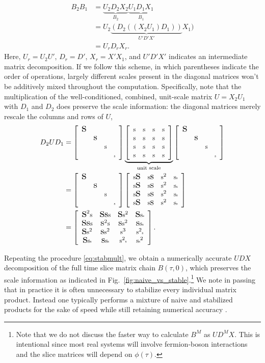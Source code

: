 \documentclass[submission, Phys]{SciPost}
\newcommand{\stiny}{\scalebox{0.5}{s}}
\newcommand{\ssmall}{\scalebox{0.9}{s}}
\newcommand{\smedium}{\scalebox{1.3}{s}}
\newcommand{\slarge}{\scalebox{1.7}{s}}
\newcommand{\U}{\left[
	\begin{array}{cccc}
		\ssmall & \ssmall & \ssmall & \ssmall \\
		\ssmall & \ssmall & \ssmall & \ssmall \\
		\ssmall & \ssmall & \ssmall & \ssmall \\
		\ssmall & \ssmall & \ssmall & \ssmall \\
	\end{array}
	\right]}
\newcommand{\D}{\left[
	\begin{array}{cccc}
		\slarge &  &  &  \\
		& \smedium &  &  \\
		&  & \ssmall &  \\
		&  &  & \stiny \\
	\end{array}
	\right]}
\begin{document}
\begin{align}
	B_2 B_1 &= \underbrace{U_2 D_2 X_2}_{B_2}\underbrace{U_1 D_1 X_1}_{B_1} \nonumber\\
	&= U_2 \underbrace{(D_2 ((X_2 U_1) D_1))}_{U' D' X'} X_1)\label{eq:stabmult}\\
	&= U_r D_r X_r. \nonumber
\end{align}
Here, $U_r = U_2 U'$, $D_r = D'$, $X_r = X' X_1$, and $U'D'X'$ indicates an intermediate matrix decomposition. If we follow this scheme, in which parentheses indicate the order of operations, largely different scales present in the diagonal matrices won't be additively mixed throughout the computation. Specifically, note that the multiplication of the well-conditioned, combined, unit-scale matrix $U = X_2 U_1$ with $D_1$ and $D_2$ does preserve the scale information: the diagonal matrices merely rescale the columns and rows of $U$,
\begin{align}
D_2  U D_1 &= \D  \underbrace{\U}_{\textrm{unit scale}} \D  \\
&= \D \left[
\begin{array}{cccc}
\ssmall\slarge & \ssmall\smedium & \ssmall^2 & \ssmall\stiny \\
\ssmall\slarge & \ssmall\smedium & \ssmall^2 & \ssmall\stiny \\
\ssmall\slarge & \ssmall\smedium & \ssmall^2 & \ssmall\stiny \\
\ssmall\slarge & \ssmall\smedium & \ssmall^2 & \ssmall\stiny \\
\end{array}
\right]\\
&= \left[
\begin{array}{cccc}
	\slarge^2\ssmall & \slarge\smedium\ssmall & \slarge\ssmall^2 & \slarge\ssmall\stiny \\
	\slarge\smedium\ssmall & \smedium^2\ssmall & \smedium\ssmall^2 & \smedium\ssmall\stiny \\
	\slarge\ssmall^2 & \smedium\ssmall^2 & \ssmall^3 & \ssmall^2\stiny \\
	\slarge\ssmall\stiny & \smedium\ssmall\stiny & \ssmall^2\stiny & \ssmall\stiny^2 \\
\end{array}
\right].
\end{align}

Repeating the procedure \eqref{eq:stabmult}, we obtain a numerically accurate $UDX$ decomposition of the full time slice matrix chain $B(\tau, 0)$, which preserves the scale information as indicated in Fig.~\ref{fig:naive_vs_stable}.\footnote{Note that we do not discuss the faster way to calculate $B^M$ as $U D^M X$. This is intentional since most real systems will involve fermion-boson interactions and the slice matrices will depend on $\phi(\tau)$.} We note in passing that in practice it is often unnecessary to stabilize every individual matrix product. Instead one typically performs a mixture of naive and stabilized products for the sake of speed while still retaining numerical accuracy \cite{Assaad2002a}.
\end{document}

